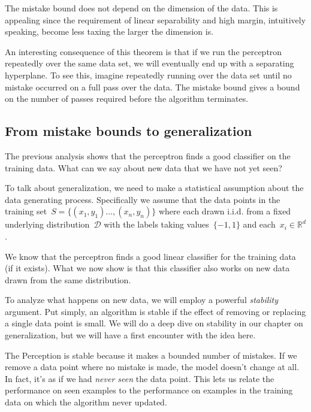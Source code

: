 \documentclass{tufte-book}
\begin{document}
The mistake bound does not depend on the dimension of the data. This is
appealing since the requirement of linear separability and high margin,
intuitively speaking, become less taxing the larger the dimension is.

An interesting consequence of this theorem is that if we run the
perceptron repeatedly over the same data set, we will eventually end up
with a separating hyperplane. To see this, imagine repeatedly running
over the data set until no mistake occurred on a full pass over the
data. The mistake bound gives a bound on the number of passes required
before the algorithm terminates.

\hypertarget{from-mistake-bounds-to-generalization}{%
\subsection{From mistake bounds to
generalization}\label{from-mistake-bounds-to-generalization}}

The previous analysis shows that the perceptron finds a good classifier
on the training data. What can we say about new data that we have not
yet seen?

To talk about generalization, we need to make a statistical assumption
about the data generating process. Specifically we assume that the data
points in the training set~\(S=\{(x_1,y_1)\ldots, (x_n,y_n) \}\) where
each drawn i.i.d. from a fixed underlying distribution~\(\mathcal{D}\)
with the labels taking values~\(\{ -1,1 \}\) and
each~\(x_i \in \mathbb{R}^d\).

We know that the perceptron finds a good linear classifier for the
training data (if it exists). What we now show is that this classifier
also works on new data drawn from the same distribution.

To analyze what happens on new data, we will employ a powerful
\emph{stability} argument. Put simply, an algorithm is stable if the
effect of removing or replacing a single data point is small. We will do
a deep dive on stability in our chapter on generalization, but we will
have a first encounter with the idea here.

The Perception is stable because it makes a bounded number of mistakes.
If we remove a data point where no mistake is made, the model doesn't
change at all. In fact, it's as if we had \emph{never seen} the data
point. This lets us relate the performance on seen examples to the
performance on examples in the training data on which the algorithm
never updated.
\end{document}
